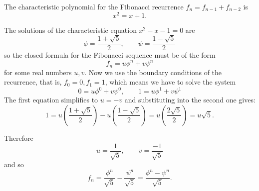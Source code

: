 \documentclass[12pt]{article}
\begin{document}
The characteristic polynomial for the Fibonacci recurrence $f_n = f_{n-1}+f_{n-2}$ is
\[
x^2 = x +1.
\]

The solutions of the characteristic equation $x^2-x-1=0$ are 
\[
\phi=\frac{1+\sqrt5}2,\qquad \psi=\frac{1-\sqrt5}2
\]
so the closed formula for the Fibonacci sequence must be of the form
\[
f_n = u\phi^n +v\psi^n
\]
for some real numbers $u,v$. Now we use the boundary conditions of the recurrence, that is, $f_0=0, f_1=1$, which means we have to solve the system
\[
0=u \phi^0 +v\psi^0, \qquad 1=u\phi^1 + v\psi^1
\]
The first equation simplifies to $u=-v$ and substituting into the second one gives:
\[
1=u\left(\frac{1+\sqrt5}2\right) - u\left(\frac{1-\sqrt5}2\right) = u\left(\frac{2\sqrt{5}}2\right)=u\sqrt{5}.
\]

Therefore
\[
u=\frac{1}{\sqrt5},\qquad v=\frac{-1}{\sqrt5}
\]
and so
\[
f_n = \frac{\phi^n}{\sqrt5}- \frac{\psi^n}{\sqrt5}=\frac{\phi^n-\psi^n}{\sqrt5}.
\]
\end{document}
